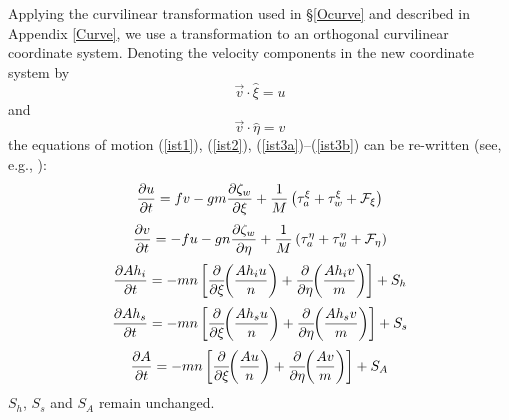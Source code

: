 Applying the curvilinear transformation used in \S\ref{Ocurve} and
described in Appendix \ref{Curve}, we use a transformation to an
orthogonal curvilinear coordinate system.  Denoting the velocity
components in the new coordinate system by
\begin{equation}
   \vec{v} \cdot \hat{\xi} = u
\end{equation}
and
\begin{equation}
   \vec{v} \cdot \hat{\eta} = v
\end{equation}
the equations of motion (\ref{ist1}), (\ref{ist2}),
(\ref{ist3a})--(\ref{ist3b}) can be re-written
(see, e.g., \cite{AL}):
{\samepage
\begin{equation}
   {\partial u \over \partial t} = fv
   - gm {\partial \zeta_w \over \partial \xi} +
   {1 \over M} \left( \tau_a^{\xi} + \tau_w^{\xi} + {\cal F}_{\xi}
   \right)
\label{ist13}
\end{equation}
}
\vspace{.2cm}
{\samepage
\begin{equation}
   {\partial v \over \partial t} = - fu
   - gn {\partial \zeta_w \over \partial \eta} +
   {1 \over M} \left( \tau_a^{\eta} + \tau_w^{\eta} + {\cal F}_{\eta}
   \right)
\label{ist14}
\end{equation}
}
\begin{equation}
   {\partial A h_i \over \partial t} =
   - mn \left[ {\partial \over \partial \xi} \!\!
   \left( {A h_i u \over n}
   \right ) + {\partial \over \partial \eta} \!\!
   \left( {A h_i v \over m}
   \right) \right] + S_h
\label{ist15}
\end{equation}
\begin{equation}
   {\partial A h_s \over \partial t} =
   - mn \left[ {\partial \over \partial \xi} \!\!
   \left( {A h_s u \over n}
   \right ) + {\partial \over \partial \eta} \!\!
   \left( {A h_s v \over m}
   \right) \right] + S_s
\label{ist15a}
\end{equation}
\begin{equation}
   {\partial A \over \partial t} =
   - mn \left[ {\partial \over \partial \xi} \!\! \left( {Au \over n}
   \right ) + {\partial \over \partial \eta} \!\! \left( {Av \over m}
   \right) \right] + S_A
\label{ist16}
\end{equation}
\vspace{.2cm}
$S_h$, $S_s$ and $S_A$ remain unchanged.

